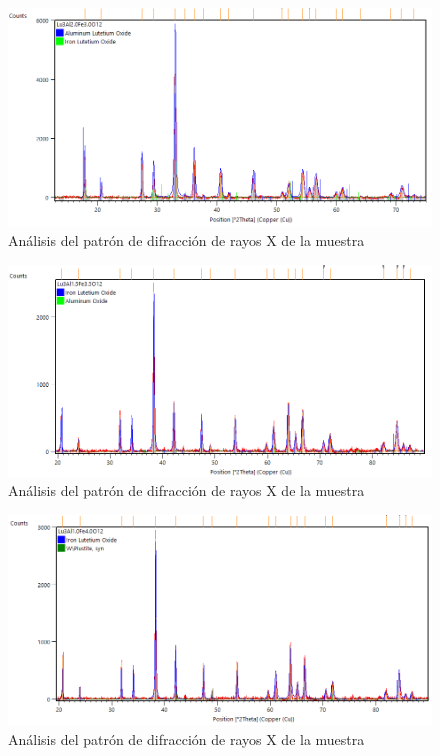 \begin{appendix}
	\begin{figure}[h]
		\centering%
		\includegraphics[width=\textwidth]{Anexos/x=30.png}%
		\caption{Análisis del patrón de difracción de rayos X de la muestra
		} \label{fig:XpertX30}
	\end{figure}

	\begin{figure}[h]
		\centering%
		\includegraphics[width=\textwidth]{Anexos/x=35}%
		\caption{Análisis del patrón de difracción de rayos X de la muestra
		} \label{fig:XpertX35}
	\end{figure}

	\begin{figure}[h]
		\centering%
		\includegraphics[width=\textwidth]{Anexos/x=40.png}%
		\caption{Análisis del patrón de difracción de rayos X de la muestra
		} \label{fig:XpertX40}
	\end{figure}


\end{appendix}
